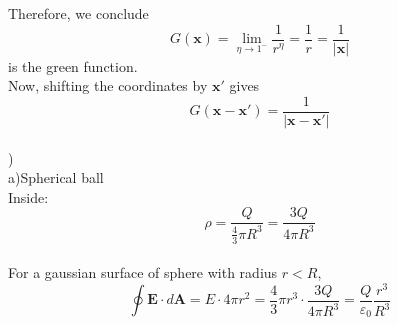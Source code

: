 \documentclass[letterpage]{article}
\begin{document}
\noindent
Therefore, we conclude
\begin{equation*}
  G(\textbf{x}) = \lim_{\eta \to 1^-} \frac{1}{r^\eta} = \frac{1}{r}
  = \frac{1}{|\textbf{x}|}
\end{equation*}
is the green function.\\

\noindent
Now, shifting the coordinates by $\mathbf{x'}$ gives
\begin{equation*}
  G(\textbf{x} - \textbf{x}') = \frac{1}{|\textbf{x} - \textbf{x}'|}
\end{equation*}\\

)\\
a)Spherical ball\\
Inside:
\begin{equation*}
  \rho = \frac{Q}{\frac{4}{3} \pi R^3} = \frac{3Q}{4\pi R^3}
\end{equation*}\\
For a gaussian surface of sphere with radius $r<R$,
\begin{equation*}
  \oint \textbf{E} \cdot d \textbf{A} = E \cdot 4\pi r^2 = \frac{4}{3} \pi r^3
  \cdot \frac{3Q}{4\pi R^3} = \frac{Q}{\varepsilon_0} \frac{r^3}{R^3}
\end{equation*}
\end{document}
